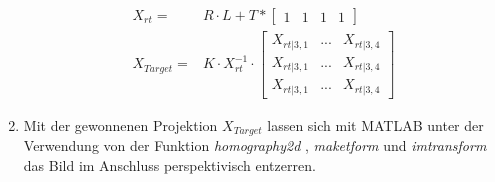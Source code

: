 \begin{enumerate}
\begin{align*}
	X_{rt} =& R \cdot L + T * \begin{bmatrix}
	1 & 1 & 1 & 1
	\end{bmatrix} \\[1mm]
	X_{Target} =& K \cdot X_{rt}^{-1} \cdot \begin{bmatrix}
 	X_{rt|3,1} & ... & X_{rt|3,4} \\ 
 	X_{rt|3,1} & ... & X_{rt|3,4} \\
 	X_{rt|3,1} & ... & X_{rt|3,4}
 	\end{bmatrix}	
	\end{align*}
	\item Mit der gewonnenen Projektion $X_{Target}$ lassen sich mit MATLAB unter der Verwendung von der Funktion \textit{homography2d} \cite{Peter}, \textit{maketform} und \textit{imtransform} \cite{Steve} das Bild im Anschluss perspektivisch entzerren.	
\end{enumerate}
